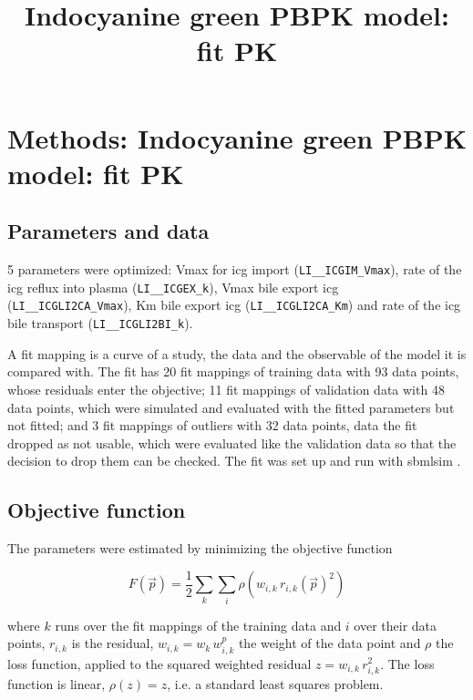 \documentclass{article}
\title{Indocyanine green PBPK model: fit PK}
\date{}
\begin{document}
\maketitle

\section{Methods: Indocyanine green PBPK model: fit PK}

\subsection{Parameters and data}

5 parameters were optimized: Vmax for icg import (\texttt{LI\_\_ICGIM\_Vmax}), rate of the icg reflux into plasma (\texttt{LI\_\_ICGEX\_k}), Vmax bile export icg (\texttt{LI\_\_ICGLI2CA\_Vmax}), Km bile export icg (\texttt{LI\_\_ICGLI2CA\_Km}) and rate of the icg bile transport (\texttt{LI\_\_ICGLI2BI\_k}).

A fit mapping is a curve of a study, the data and the observable of the model it is compared with. The fit has 20 fit mappings of training data with 93 data points, whose residuals enter the objective; 11 fit mappings of validation data with 48 data points, which were simulated and evaluated with the fitted parameters but not fitted; and 3 fit mappings of outliers with 32 data points, data the fit dropped as not usable, which were evaluated like the validation data so that the decision to drop them can be checked. The fit was set up and run with sbmlsim \cite{Koenig2026_sbmlsim}.

\subsection{Objective function}

The parameters were estimated by minimizing the objective function

\begin{equation}
F(\vec{p}) = \frac{1}{2} \sum_{k} \sum_{i} \rho\left(w_{i,k}\, r_{i,k}(\vec{p})^2\right)
\end{equation}

where $k$ runs over the fit mappings of the training data and $i$ over their data points, $r_{i,k}$ is the residual, $w_{i,k} = w_k\, w^{p}_{i,k}$ the weight of the data point and $\rho$ the loss function, applied to the squared weighted residual $z = w_{i,k}\, r_{i,k}^2$. The loss function is linear, $\rho(z) = z$, i.e. a standard least squares problem.
\end{document}
